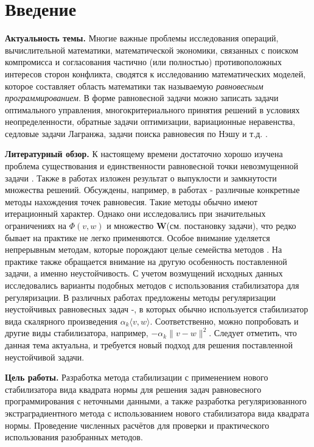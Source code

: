 {}
\section*{Введение}
	\textbf{Актуальность темы.} Многие важные проблемы исследования операций, вычислительной математики, математической экономики, связанных с поиском компромисса и согласования частично (или полностью) противоположных интересов сторон конфликта, сводятся к исследованию математических моделей, которое составляет область математики так называемую \emph{равновесным программированием}. В форме равновесной задачи можно записать задачи оптимального управления, многокритериального принятия решений в условиях неопределенности, обратные задачи оптимизации, вариационные неравенства, седловые задачи Лагранжа, задачи поиска равновесия по Нэшу и т.д. \cite{8}. 
	
	\textbf{Литературный обзор.} К настоящему времени достаточно хорошо изучена проблема существования и единственности равновесной точки невозмущенной задачи \cite{6}. Также в работах \cite{4}\cite{6} изложен результат о выпуклости и замкнутости множества решений. 
	Обсуждены, например, в работах \cite{7}-\cite{10-2} различные конкретные методы нахождения точек равновесия. Такие методы обычно имеют итерационный характер. Однако они исследовались при значительных ограничениях на $\Phi(v,w)$ и множество $\mathbf{W}$(см. постановку задачи), что редко бывает на практике не легко применяются. Особое внимание уделяется непрерывным методам, которые порождают целые семейства методов \cite{10}. На практике также обращается внимание на другую особенность поставленной задачи, а именно неустойчивость. С учетом возмущений исходных данных исследовались варианты подобных методов с использования стабилизатора для регуляризации. В различных работах предложены методы регуляризации неустойчивых равновесных задач \cite{11}-\cite{16}, в которых обычно используется стабилизатор вида скалярного произведения $\alpha_k\langle v,w\rangle$. Соответственно, можно попробовать и другие виды стабилизатора, например, $-\alpha_k\|v-w\|^2$. Следует отметить, что данная тема актуальна, и требуется новый подход для решения поставленной неустойчивой задачи.
	
	\textbf{Цель работы.} Разработка метода стабилизации с применением нового стабилизатора вида квадрата нормы для решения задач равновесного программирования с неточными данными, а также разработка регуляризованного экстраградиентного метода с использованием нового стабилизатора вида квадрата нормы. Проведение численных расчётов для проверки и практического использования разобранных методов. 
	
